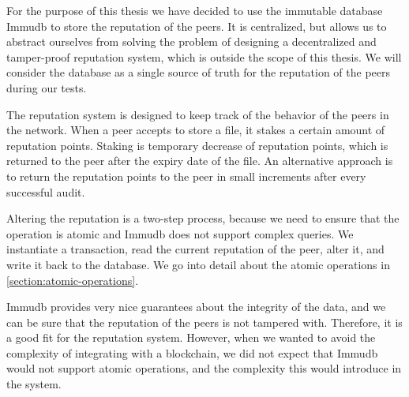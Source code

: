 For the purpose of this thesis we have decided to use the immutable database Immudb \cite{immudb}
to store the reputation of the peers.
It is centralized, but allows us to abstract ourselves from solving the problem of designing a
decentralized and tamper-proof reputation system, which is outside the scope of this thesis.
We will consider the database as a single source of truth for the reputation of the peers
during our tests.

The reputation system is designed to keep track of the behavior of the peers in the network.
When a peer accepts to store a file, it stakes a certain amount of reputation points.
Staking is temporary decrease of reputation points,
which is returned to the peer after the expiry date of the file.
An alternative approach is to return the reputation points to the peer in small increments
after every successful audit.

Altering the reputation is a two-step process, because we need to ensure that the operation is atomic
and Immudb does not support complex queries.
We instantiate a transaction, read the current reputation of the peer, alter it, and write it back to the database.
We go into detail about the atomic operations in \autoref{section:atomic-operations}.

Immudb provides very nice guarantees about the integrity of the data,
and we can be sure that the reputation of the peers is not tampered with.
Therefore, it is a good fit for the reputation system.
However, when we wanted to avoid the complexity of integrating with a blockchain,
we did not expect that Immudb would not support atomic operations,
and the complexity this would introduce in the system.
